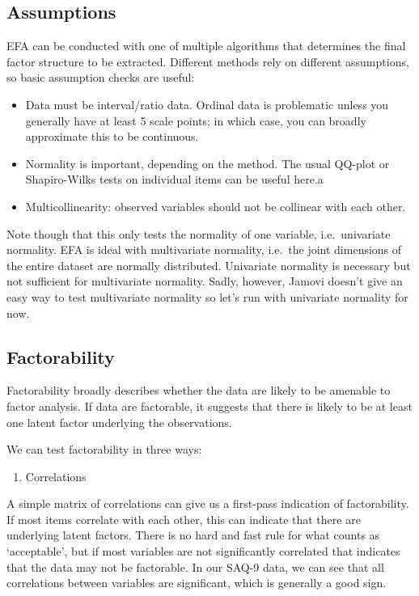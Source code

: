 \documentclass[
]{book}
\providecommand{\tightlist}{%
  \setlength{\itemsep}{0pt}\setlength{\parskip}{0pt}}
\begin{document}
\subsection{Assumptions}\label{assumptions-4}

EFA can be conducted with one of multiple algorithms that determines the final factor structure to be extracted. Different methods rely on different assumptions, so basic assumption checks are useful:

\begin{itemize}
\tightlist
\item
  Data must be interval/ratio data. Ordinal data is problematic unless you generally have at least 5 scale points; in which case, you can broadly approximate this to be continuous.
\item
  Normality is important, depending on the method. The usual QQ-plot or Shapiro-Wilks tests on individual items can be useful here.a
\item
  Multicollinearity: observed variables should not be collinear with each other.
\end{itemize}

Note though that this only tests the normality of one variable, i.e.~univariate normality. EFA is ideal with multivariate normality, i.e.~the joint dimensions of the entire dataset are normally distributed. Univariate normality is necessary but not sufficient for multivariate normality. Sadly, however, Jamovi doesn't give an easy way to test multivariate normality so let's run with univariate normality for now.

\subsection{Factorability}\label{factorability}

Factorability broadly describes whether the data are likely to be amenable to factor analysis. If data are factorable, it suggests that there is likely to be at least one latent factor underlying the observations.

We can test factorability in three ways:

\begin{enumerate}
\def\labelenumi{\arabic{enumi}.}
\tightlist
\item
  Correlations
\end{enumerate}

A simple matrix of correlations can give us a first-pass indication of factorability. If most items correlate with each other, this can indicate that there are underlying latent factors. There is no hard and fast rule for what counts as `acceptable', but if most variables are not significantly correlated that indicates that the data may not be factorable. In our SAQ-9 data, we can see that all correlations between variables are significant, which is generally a good sign.
\end{document}
